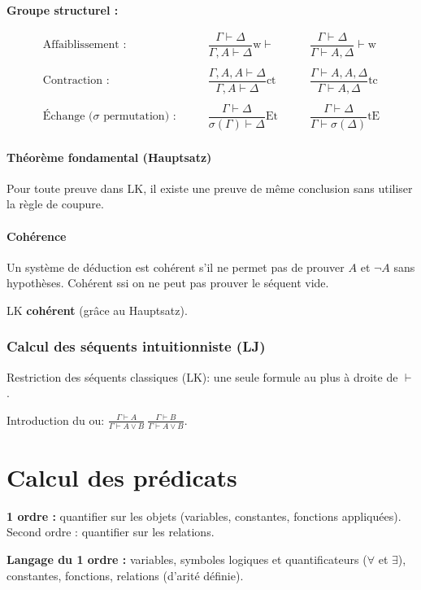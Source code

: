 \documentclass[french]{article}
\begin{document}
\textbf{Groupe structurel :}

\begin{align*}
\text{Affaiblissement :} &\qquad \dfrac{\Gamma\vdash\Delta}{\Gamma, A\vdash\Delta}\text{w}\vdash &\qquad
\dfrac{\Gamma\vdash\Delta}{\Gamma\vdash A,\Delta}\vdash\text{w}\\
\\
\text{Contraction :} &\qquad\dfrac{\Gamma, A, A\vdash\Delta}{\Gamma, A\vdash\Delta}\text{ct} &\qquad
\dfrac{\Gamma\vdash A, A,\Delta}{\Gamma\vdash A,\Delta}\text{tc}\\
\\
\text{Échange ($\sigma$ permutation) :}&\qquad\dfrac{\Gamma\vdash\Delta}{\sigma (\Gamma)\vdash\Delta}\text{Et} &\qquad
\dfrac{\Gamma\vdash\Delta}{\Gamma\vdash\sigma (\Delta)}\text{tE}
\end{align*}


\paragraph{Théorème fondamental (Hauptsatz)}
Pour toute preuve dans LK, il existe une preuve de même conclusion sans utiliser la règle de coupure.

\paragraph{Cohérence} Un système de déduction est cohérent s'il ne permet pas de prouver $A$ et $\neg A$ sans hypothèses. Cohérent ssi on ne peut pas prouver le séquent vide.

LK \textbf{cohérent} (grâce au Hauptsatz).

\subsubsection{Calcul des séquents intuitionniste (LJ)}
Restriction des séquents classiques (LK): une seule formule au plus à droite de $\vdash$.

Introduction du ou:
$\frac{\Gamma\vdash A}{\Gamma\vdash A\vee B}\ \frac{\Gamma\vdash B}{\Gamma\vdash A\vee B}$.

\section{Calcul des prédicats}
\textbf{1 ordre :} quantifier sur les objets (variables, constantes, fonctions appliquées). Second ordre : quantifier sur les relations.

\textbf{Langage du 1 ordre :} variables, symboles logiques et quantificateurs ($\forall$ et $\exists$), constantes, fonctions, relations (d'arité définie).
\end{document}
